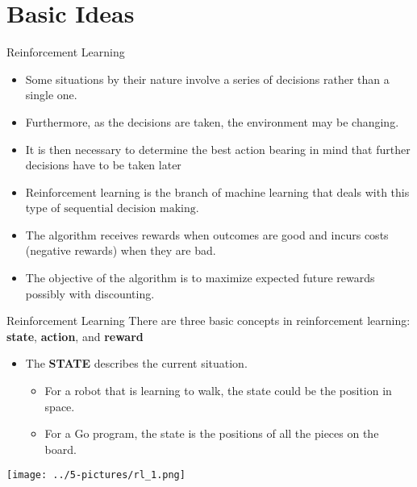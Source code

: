 \documentclass[11pt]{beamer}
\newcommand{\highlight}[1]{%
  \colorbox{yellow!50}{$\displaystyle#1$}}
\begin{document}
\section{Basic Ideas}
\begin{frame}{Reinforcement Learning}
	\begin{itemize}
		\item Some situations by their nature involve a series of decisions rather than a single one. 
		\item Furthermore, as the decisions are taken, the environment may be changing. 
		\item It is then necessary to determine the best action bearing in mind that further decisions have to be taken later
		\item Reinforcement learning is the branch of machine learning that deals with this type of \highlight{\text{sequential decision making}}.
		\item The algorithm receives rewards when outcomes are good and incurs costs (negative rewards) when they are bad. 
		\item The objective of the algorithm is to maximize expected future rewards possibly with discounting.
	\end{itemize}
\end{frame}
\begin{frame}{Reinforcement Learning}
There are three basic concepts in reinforcement learning: \textbf{state}, \textbf{action}, and \textbf{reward} \\
\vspace{.5cm}
	\begin{itemize}
		\item The \textbf{STATE} describes the current situation. 
		\begin{itemize}
		\item For a robot that is learning to walk, the state could be the position in space. 
		\item For a Go program, the state is the positions of all the pieces on the board. 
		\end{itemize}
	\end{itemize}
\begin{center}
\texttt{[image: ../5-pictures/rl\_1.png]} 
\end{center}	
\end{frame}
\end{document}
